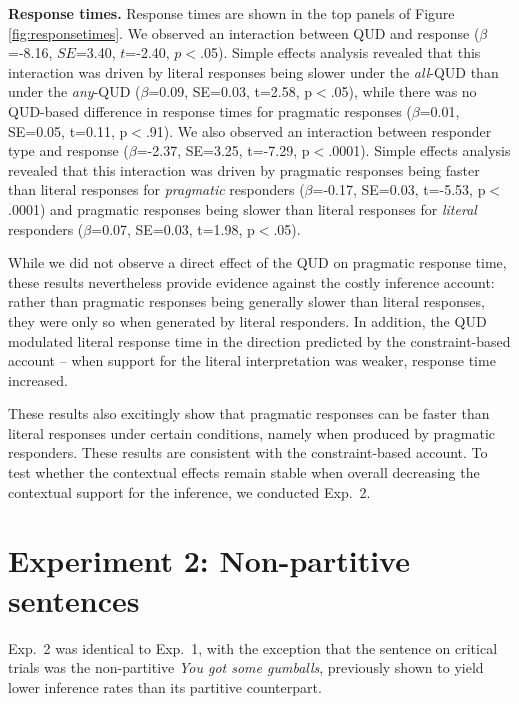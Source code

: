 \documentclass[10pt,letterpaper]{article}
\newcommand{\figref}[1]{Figure \ref{#1}}
\begin{document}
  
\noindent \textbf{Response times.} Response times are shown in the top panels of \figref{fig:responsetimes}. We observed an interaction between QUD and response ($\beta$=-8.16, $SE$=3.40, $t$=-2.40, $p$$<$.05). Simple effects analysis revealed that this interaction was driven by literal responses being slower under the \textit{all}-QUD than under the \textit{any}-QUD ($\beta$=0.09, SE=0.03, t=2.58, p$<$.05), while there was no QUD-based difference in response times for pragmatic responses ($\beta$=0.01, SE=0.05, t=0.11, p$<$.91). We also observed an interaction between responder type and response ($\beta$=-2.37, SE=3.25, t=-7.29, p$<$.0001). 
Simple effects analysis revealed that this interaction was driven by pragmatic responses being faster than literal responses for \emph{pragmatic}  responders ($\beta$=-0.17, SE=0.03, t=-5.53, p$<$.0001) and pragmatic responses being slower than literal responses for \emph{literal} responders ($\beta$=0.07, SE=0.03, t=1.98, p$<$.05). 

While we did not observe a direct effect of the QUD on pragmatic response time, these results nevertheless provide evidence against the costly inference account: rather than pragmatic responses being generally slower than literal responses, they were only so when generated by literal responders. In addition, the QUD modulated literal response time in the direction predicted by the constraint-based account -- when support for the literal interpretation was weaker, response time increased.

These results also excitingly show that pragmatic responses can be faster than literal responses under certain conditions, namely when produced by pragmatic responders. These results are consistent with the constraint-based account. To test whether the contextual effects remain stable when overall decreasing the contextual support for the inference, we conducted Exp.~2.


\section{Experiment 2: Non-partitive sentences}

Exp.~2 was identical to Exp.~1, with the exception that the sentence on critical trials was the non-partitive \emph{You got some gumballs}, previously shown to yield lower inference rates than its partitive counterpart. %
\end{document}

